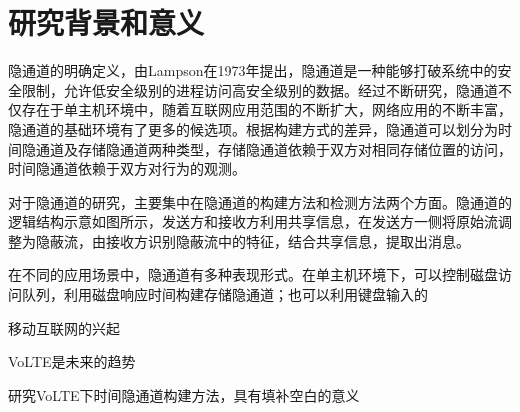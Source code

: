 \section{研究背景和意义}
\label{sec:intro:backgroud}



隐通道的明确定义，由Lampson在1973年提出，隐通道是一种能够打破系统中的安全限制，允许低安全级别的进程访问高安全级别的数据。经过不断研究，隐通道不仅存在于单主机环境中，随着互联网应用范围的不断扩大，网络应用的不断丰富，隐通道的基础环境有了更多的候选项。根据构建方式的差异，隐通道可以划分为时间隐通道及存储隐通道两种类型，存储隐通道依赖于双方对相同存储位置的访问，时间隐通道依赖于双方对行为的观测。


对于隐通道的研究，主要集中在隐通道的构建方法和检测方法两个方面。隐通道的逻辑结构示意如图所示，发送方和接收方利用共享信息，在发送方一侧将原始流调整为隐蔽流，由接收方识别隐蔽流中的特征，结合共享信息，提取出消息。

在不同的应用场景中，隐通道有多种表现形式。在单主机环境下，可以控制磁盘访问队列，利用磁盘响应时间构建存储隐通道；也可以利用键盘输入的

移动互联网的兴起

VoLTE是未来的趋势

研究VoLTE下时间隐通道构建方法，具有填补空白的意义
